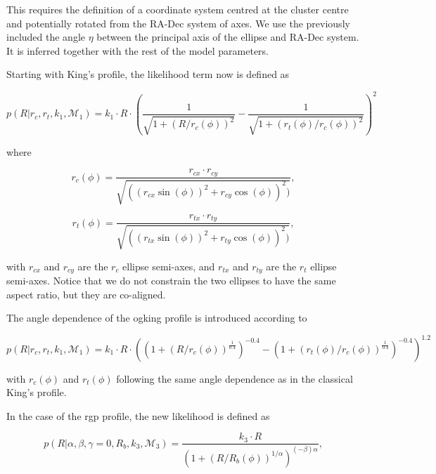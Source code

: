 This requires the definition of a coordinate system centred at the cluster centre and potentially rotated from the RA-Dec system of axes. We use the previously included the angle $\eta$ between the principal axis of the ellipse and RA-Dec system.  It is inferred together with the rest of the model parameters.

Starting with King's profile, the likelihood term now is defined as
 
\begin{equation}
  p(R|r_c, r_t, k_1,\mathcal{M}_1)=
  k_1\cdot R \cdot
  \left(\frac{1}{\sqrt{1+(R/r_c(\phi))^2}} - \frac{1}{\sqrt{1+(r_t(\phi)/r_c(\phi))^2}}\right)^2
\label{eq:KingEll}
\end{equation}

where


\begin{equation}
r_c(\phi) = \frac{r_{cx}\cdot r_{cy}}{\sqrt{((r_{cx}\sin(\phi))^2+r_{cy}\cos(\phi))^2)}},
\label{eq:anglerc}
\end{equation}

\begin{equation}
r_t(\phi) = \frac{r_{tx}\cdot r_{ty}}{\sqrt{((r_{tx}\sin(\phi))^2+r_{ty}\cos(\phi))^2)}},
\label{eq:anglert}
\end{equation}

with $r_{cx}$ and $r_{cy}$ are the $r_c$ ellipse semi-axes, and $r_{tx}$ and $r_{ty}$ are the $r_t$ ellipse semi-axes. Notice that we do not constrain the two ellipses to have the same aspect ratio, but they are co-aligned.

The angle dependence of the \gls{ogking} profile is introduced according to

\begin{equation}
    p(R|r_c, r_t, k_1,\mathcal{M}_1)=
    k_1\cdot R \cdot
  \left(
  \left(1+(R/r_c(\phi))^{\frac{1}{0.4}}\right)^{-0.4}
  -
  \left(1+(r_t(\phi)/r_c(\phi))^{\frac{1}{0.4}}\right)^{-0.4}
  \right)^{1.2}
\end{equation}

with $r_c(\phi)$ and $r_t(\phi)$ following the same angle dependence as in the classical King's profile.

In the case of the \gls{rgp} profile, the new likelihood is defined as

\begin{equation}
  p(R| \alpha, \beta, \gamma=0, R_b, k_3,\mathcal{M}_3 ) = \frac
  {k_3\cdot R} {(1+(R/R_b(\phi))^{1/\alpha})^{(-\beta)\alpha}},
  \label{eq:EllRGP}
\end{equation}

